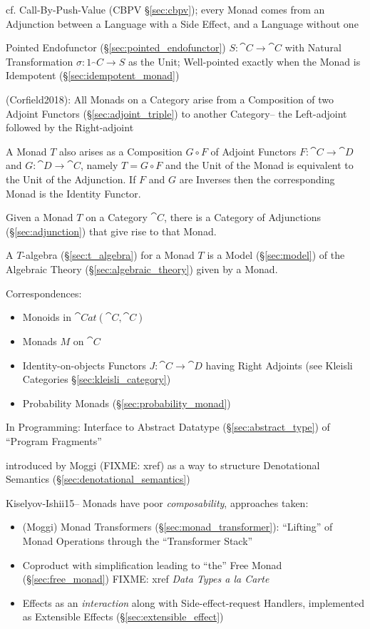 \fist cf. Call-By-Push-Value (CBPV \S\ref{sec:cbpv}); every Monad comes from an
Adjunction between a Language with a Side Effect, and a Language without one

Pointed Endofunctor (\S\ref{sec:pointed_endofunctor}) $S : \cat{C}
\rightarrow \cat{C}$ with Natural Transformation $\sigma : 1_\cat{C}
\rightarrow S$ as the Unit; Well-pointed exactly when the Monad is
Idempotent (\S\ref{sec:idempotent_monad})

(Corfield2018): All Monads on a Category arise from a Composition of two Adjoint
Functors (\S\ref{sec:adjoint_triple}) to another Category-- the Left-adjoint
followed by the Right-adjoint

A Monad $T$ also arises as a Composition $G \circ F$ of Adjoint
Functors $F : \cat{C} \rightarrow \cat{D}$ and $G : \cat{D}
\rightarrow \cat{C}$, namely $T = G \circ F$ and the Unit of the Monad
is equivalent to the Unit of the Adjunction. If $F$ and $G$ are
Inverses then the corresponding Monad is the Identity Functor.

Given a Monad $T$ on a Category $\cat{C}$, there is a Category of
Adjunctions (\S\ref{sec:adjunction}) that give rise to that Monad.

A $T$-algebra (\S\ref{sec:t_algebra}) for a Monad $T$ is a Model
(\S\ref{sec:model}) of the Algebraic Theory
(\S\ref{sec:algebraic_theory}) given by a Monad.

Correspondences: \cite{jacobs-heunen-hasuo09}
\begin{itemize}
\item Monoids in $\cat{Cat}(\cat{C},\cat{C})$
\item Monads $M$ on $\cat{C}$
\item Identity-on-objects Functors $J : \cat{C} \rightarrow \cat{D}$
  having Right Adjoints (see Kleisli Categories
  \S\ref{sec:kleisli_category})
\end{itemize}

\begin{itemize}
  \item Probability Monads (\S\ref{sec:probability_monad})
\end{itemize}

In Programming: Interface to Abstract Datatype
(\S\ref{sec:abstract_type}) of ``Program Fragments''

introduced by Moggi (FIXME: xref) as a way to structure Denotational Semantics
(\S\ref{sec:denotational_semantics})

Kiselyov-Ishii15-- Monads have poor \emph{composability}, approaches taken:
\begin{itemize}
  \item (Moggi) Monad Transformers (\S\ref{sec:monad_transformer}): ``Lifting''
    of Monad Operations through the ``Transformer Stack''
  \item Coproduct with simplification leading to ``the'' Free Monad
    (\S\ref{sec:free_monad}) FIXME: xref \emph{Data Types a la Carte}
  \item Effects as an \emph{interaction} along with Side-effect-request
    Handlers, implemented as Extensible Effects (\S\ref{sec:extensible_effect})
\end{itemize}

